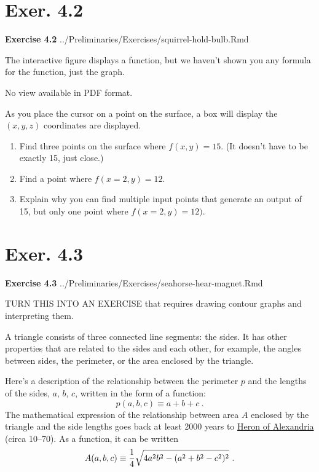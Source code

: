 \documentclass[
  letterpaper,
  DIV=11,
  numbers=noendperiod,
  oneside]{article}
\begin{document}
\begin{multicols}{2}
\hypertarget{exer.-4.2}{%
\section*{Exer. 4.2}\label{exer.-4.2}}

\textbf{Exercise 4.2} ../Preliminaries/Exercises/squirrel-hold-bulb.Rmd

The interactive figure displays a function, but we haven't shown you any
formula for the function, just the graph.

No view available in PDF format.

As you place the cursor on a point on the surface, a box will display
the \((x,y,z)\) coordinates are displayed.

\begin{enumerate}
\def\labelenumi{\arabic{enumi}.}
\item
  Find three points on the surface where \(f(x, y)=15\). (It doesn't
  have to be exactly 15, just close.)
\item
  Find a point where \(f(x=2, y) = 12\).
\item
  Explain why you can find multiple input points that generate an output
  of 15, but only one point where \(f(x=2, y)=12)\).
\end{enumerate}

\hypertarget{exer.-4.3}{%
\section*{Exer. 4.3}\label{exer.-4.3}}

\textbf{Exercise 4.3}
../Preliminaries/Exercises/seahorse-hear-magnet.Rmd

TURN THIS INTO AN EXERCISE that requires drawing contour graphs and
interpreting them.

A triangle consists of three connected line segments: the sides. It has
other properties that are related to the sides and each other, for
example, the angles between sides, the perimeter, or the area enclosed
by the triangle.

Here's a description of the relationship between the perimeter \(p\) and
the lengths of the sides, \(a\), \(b\), \(c\), written in the form of a
function: \[p(a,b,c) \equiv a + b + c\ .\] The mathematical expression
of the relationship between area \(A\) enclosed by the triangle and the
side lengths goes back at least 2000 years to
\href{https://en.wikipedia.org/wiki/Hero_of_Alexandria}{Heron of
Alexandria} (circa 10--70). As a function, it can be written
\[A(a,b,c) \equiv \frac{1}{4}\sqrt{\strut 4a^2b^2-(a^2+b^2-c^2)^2}\ .\]


\end{multicols}
\end{document}
